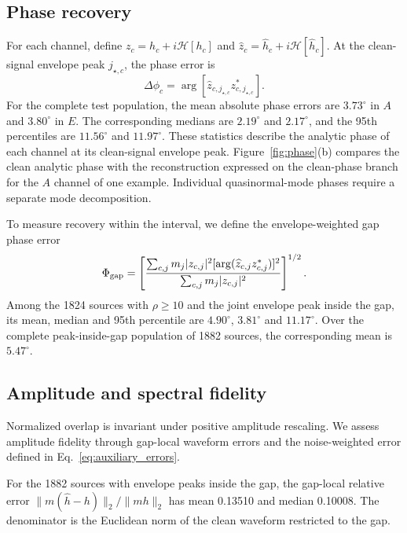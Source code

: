 \documentclass[10pt,prd,aps,a4paper,twocolumn,superscriptaddress,nofootinbib,floatfix]{revtex4-2}
\begin{document}
\subsection{Phase recovery}\label{subsec:PhaseRecoveryAlignment}
For each channel, define $z_c=h_c+i\mathcal H[h_c]$ and $\widehat z_c=\widehat h_c+i\mathcal H[\widehat h_c]$. At the clean-signal envelope peak $j_{\star,c}$, the phase error is
\begin{equation}
\Delta\phi_c=\arg[\widehat z_{c,j_{\star,c}}z_{c,j_{\star,c}}^*].
\end{equation}
For the complete test population, the mean absolute phase errors are $3.73^\circ$ in $A$ and $3.80^\circ$ in $E$. The corresponding medians are $2.19^\circ$ and $2.17^\circ$, and the 95th percentiles are $11.56^\circ$ and $11.97^\circ$. These statistics describe the analytic phase of each channel at its clean-signal envelope peak. Figure~\ref{fig:phase}(b) compares the clean analytic phase with the reconstruction expressed on the clean-phase branch for the $A$ channel of one example. Individual quasinormal-mode phases require a separate mode decomposition.

To measure recovery within the interval, we define the envelope-weighted gap phase error
\begin{equation}
\Phi_{\rm gap}=\left[\frac{\sum_{c,j}m_j|z_{c,j}|^2[\arg(\widehat z_{c,j}z_{c,j}^*)]^2}{\sum_{c,j}m_j|z_{c,j}|^2}\right]^{1/2}.\label{eq:gap_phase}
\end{equation}
Among the 1824 sources with $\rho\ge10$ and the joint envelope peak inside the gap, its mean, median and 95th percentile are $4.90^\circ$, $3.81^\circ$ and $11.17^\circ$. Over the complete peak-inside-gap population of 1882 sources, the corresponding mean is $5.47^\circ$.



\subsection{Amplitude and spectral fidelity}\label{subsec:AmplitudeFidelity}\label{subsec:AmplitudeDensityFrequencySpectrum}
Normalized overlap is invariant under positive amplitude rescaling. We assess amplitude fidelity through gap-local waveform errors and the noise-weighted error defined in Eq.~\eqref{eq:auxiliary_errors}.

For the 1882 sources with envelope peaks inside the gap, the gap-local relative error $\|m(\widehat h-h)\|_2/\|mh\|_2$ has mean 0.13510 and median 0.10008. The denominator is the Euclidean norm of the clean waveform restricted to the gap.
\end{document}
